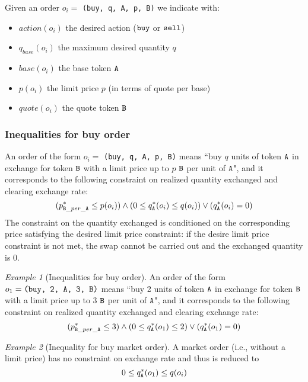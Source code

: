 \documentclass[11pt, reqno]{amsart}
\theoremstyle{definition}
\theoremstyle{remark}
\newtheorem{exmp}{Example}[subsection]
\newcommand{\tA}{\textnormal{\texttt{A}}}
\newcommand{\tB}{\textnormal{\texttt{B}}}
\newcommand{\buy}{\textnormal{\texttt{buy}}}
\newcommand{\sell}{\textnormal{\texttt{sell}}}
\begin{document}
Given an order $o_i =$ \texttt{(\buy, q, \tA, p, \tB)} we indicate with:
\begin{itemize}
	\item $action(o_i)$ the desired action ($\buy$ or $\sell$)
	\item $q_{base}(o_i)$ the maximum desired quantity $q$
	\item $base(o_i)$ the base token $\tA$
    \item $p(o_i)$ the limit price $p$ (in terms of quote per base)
	\item $quote(o_i)$ the quote token $\tB$
\end{itemize}

\subsubsection{Inequalities for buy order}
An order of the form $o_i =$ \texttt{(\buy, q, \tA, p, \tB)} means
``buy $q$ units of token $\tA$ in exchange for token $\tB$ with a limit price
up to $p$ $\tB$ per unit of $\tA$",
and it corresponds to the following constraint on realized quantity exchanged
and clearing exchange rate:
\begin{equation*}
    (p_{\tB\_per\_\tA}^* \leq p(o_i)) \land
	(0 \le q_\tA^*(o_i) \leq q(o_i)) \lor
	(q_\tA^*(o_i) = 0)
\end{equation*}
The constraint on the quantity exchanged is conditioned on the corresponding
price satisfying the desired limit price constraint: if the desire limit price
constraint is not met, the swap cannot be carried out and the exchanged quantity
is 0.

\begin{exmp}[Inequalities for buy order]
An order of the form $o_1 = \texttt{(\buy, 2, \tA, 3, \tB)}$ means
``buy 2 units of token $\tA$ in exchange for token $\tB$ with a limit price up
to 3 $\tB$ per unit of $\tA$",
and it corresponds to the following constraint on realized quantity exchanged
and clearing exchange rate:
\begin{equation*}
	(p_{\tB\_per\_\tA}^* \leq 3) \land
	(0 \le q_\tA^*(o_1) \leq 2) \lor
	(q_\tA^*(o_1) = 0)
\end{equation*}
\end{exmp}

\begin{exmp}[Inequality for buy market order]
A market order (i.e., without a limit price) has no constraint on exchange rate
and thus is reduced to
\[
	0 \le q_\tA^*(o_1) \le q(o_i)
\]
\end{exmp}
\end{document}
